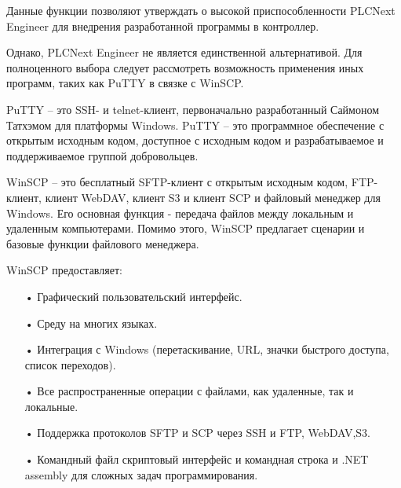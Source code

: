 {	\par \redline Данные функции позволяют утверждать о высокой приспособленности PLCNext Engineer для внедрения разработанной программы в контроллер.

	\par \redline Однако, PLCNext Engineer не является единственной альтернативой. Для полноценного выбора следует рассмотреть возможность применения иных программ, таких как PuTTY в связке с WinSCP.

	\par \redline PuTTY {--} это SSH- и telnet-клиент, первоначально разработанный Саймоном Татхэмом для платформы Windows. PuTTY {--} это программное обеспечение с открытым исходным кодом, доступное с исходным кодом и разрабатываемое и поддерживаемое группой добровольцев.

	\par \redline WinSCP {--} это бесплатный SFTP-клиент с открытым исходным кодом, FTP-клиент, клиент WebDAV, клиент S3 и клиент SCP и файловый менеджер для Windows. Его основная функция - передача файлов между локальным и удаленным компьютерами. Помимо этого, WinSCP предлагает сценарии и базовые функции файлового менеджера.

	\par \redline WinSCP предоставляет:

	\begin{itemize}[leftmargin=2.15cm, labelwidth=0.65cm, labelsep=0.0cm] 

		\item[•] 	Графический пользовательский интерфейс.  
		\addtocounter{itemcntr}{1}

		\item[•] Среду на многих языках.
		\addtocounter{itemcntr}{1}

		\item[•] Интеграция с Windows (перетаскивание, URL, значки быстрого доступа, список переходов). 
		\addtocounter{itemcntr}{1}

		\item[•] Все распространенные операции с файлами, как удаленные, так и локальные.  
		\addtocounter{itemcntr}{1}

		\item[•] Поддержка протоколов SFTP и SCP через SSH и FTP, WebDAV,S3. 
		\addtocounter{itemcntr}{1}

		\item[•]  Командный файл скриптовый интерфейс и командная строка и .NET assembly для сложных задач программирования.
		\addtocounter{itemcntr}{1}


\end{itemize}}
